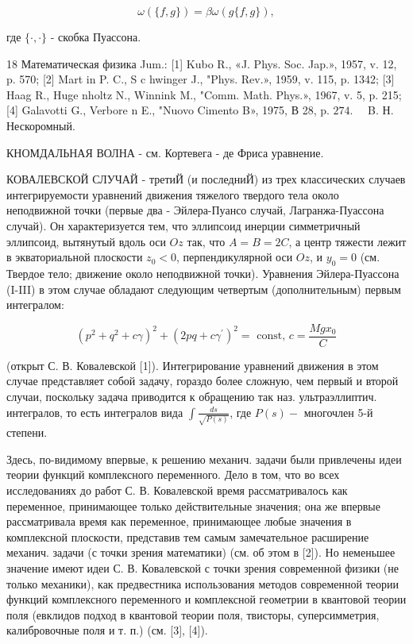 \documentclass[10pt]{article}
\begin{document}
\[

\omega(\{f, g\})=\beta \omega(g\{f, g\}),

\]



где $\{\cdot, \cdot\}$ - скобка Пуассона.



18 Математическая физика Jum.: [1] Kubo R., «J. Phys. Soc. Jap.», 1957, v. 12, p. 570; [2] Mart in P. C., S c hwinger J., "Phys. Rev.», 1959, v. 115, p. 1342; [3] Haag R., Huge nholtz N., Winnink M., "Comm. Math. Phys.», 1967, v. 5, p. 215; [4] Galavotti G., Verbore n E., "Nuovo Cimento B», 1975, В 28, p. $274 . \quad$ B. Н. Нескоромный.



КНОМДАЛЬНАЯ ВОЛНА - см. Кортевега - де Фриса уравнение.



КОВАЛЕВСКОЙ СЛУЧАЙ - третиЙ (и последниЙ) из трех классических случаев интегрируемости уравнений движения тяжелого твердого тела около неподвижной точки (первые два - Эйлера-Пуансо случай, Лагранжа-Пуассона случай). Он характеризуется тем, что эллипсоид инерции симметричный эллипсоид, вытянутый вдоль оси $O z$ так, что $A=B=2 C$, а центр тяжести лежит в экваториальной плоскости $z_{0}<0$, перпендикулярной оси $O z$, и $y_{0}=0$ (см. Твердое тело; движение около неподвижной точки). Уравнения Эйлера-Пуассона (I-III) в этом случае обладают следующим четвертым (дополнительным) первым интегралом:



\[

\left(p^{2}+q^{2}+c \gamma\right)^{2}+\left(2 p q+c \gamma^{\prime}\right)^{2}=\text { const, } c=\frac{M g x_{0}}{C}

\]



(открыт С. В. Ковалевской [1]). Интегрирование уравнений движения в этом случае представляет собой задачу, гораздо более сложную, чем первый и второй случаи, поскольку задача приводится к обращению так наз. ультраэллиптич. интегралов, то есть интегралов вида $\int \frac{d s}{\sqrt{P(s)}}$, где $P(s)-$ многочлен 5-й степени.



Здесь, по-видимому впервые, к решению механич. задачи были привлечены идеи теории функций комплексного переменного. Дело в том, что во всех исследованиях до работ С. В. Ковалевской время рассматривалось как переменное, принимающее только действительные значения; она же впервые рассматривала время как переменное, принимающее любые значения в комплексной плоскости, представив тем самым замечательное расширение механич. задачи (с точки зрения математики) (см. об этом в [2]). Но неменьшее значение имеют идеи С. В. Ковалевской с точки зрения современной физики (не только механики), как предвестника использования методов современной теории функций комплексного переменного и комплексной геометрии в квантовой теории поля (евклидов подход в квантовой теории поля, твисторы, суперсимметрия, калибровочные поля и т. п.) (см. [3], [4]).
\end{document}
